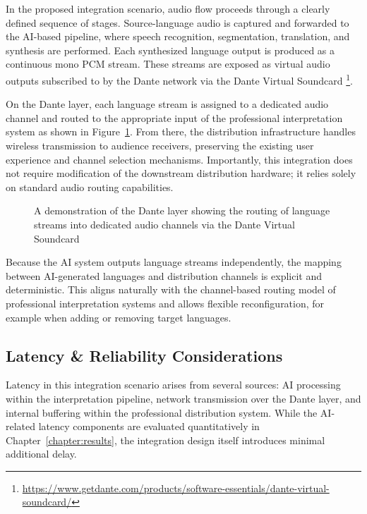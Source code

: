 
In the proposed integration scenario, audio flow proceeds through a clearly defined sequence of stages. Source-language audio is captured and forwarded to the AI-based pipeline, where speech recognition, segmentation, translation, and synthesis are performed. Each synthesized language output is produced as a continuous mono PCM stream. These streams are exposed as virtual audio outputs subscribed to by the Dante network via the Dante Virtual Soundcard \footnote{\url{https://www.getdante.com/products/software-essentials/dante-virtual-soundcard/}}.

On the Dante layer, each language stream is assigned to a dedicated audio channel and routed to the appropriate input of the professional interpretation system as shown in Figure~\ref{fig:dante_layer}. From there, the distribution infrastructure handles wireless transmission to audience receivers, preserving the existing user experience and channel selection mechanisms. Importantly, this integration does not require modification of the downstream distribution hardware; it relies solely on standard audio routing capabilities.

\begin{figure}[!htbp]
  \centering
  
  \caption[Dante Language Channel Distribution]{A demonstration of the Dante layer showing the routing of language streams into dedicated audio channels via the Dante Virtual Soundcard}
  \label{fig:dante_layer}
\end{figure}


Because the AI system outputs language streams independently, the mapping between AI-generated languages and distribution channels is explicit and deterministic. This aligns naturally with the channel-based routing model of professional interpretation systems and allows flexible reconfiguration, for example when adding or removing target languages.

\subsection*{Latency \& Reliability Considerations}

Latency in this integration scenario arises from several sources: AI processing within the interpretation pipeline, network transmission over the Dante layer, and internal buffering within the professional distribution system. While the AI-related latency components are evaluated quantitatively in Chapter~\ref{chapter:results}, the integration design itself introduces minimal additional delay.

